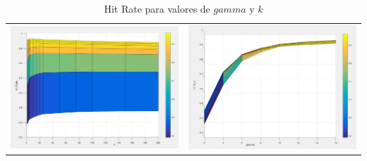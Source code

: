 \begin{table}[h!]
\begin{center}
\begin{tabular}{c c}
	\includegraphics[scale=0.3]{exp2/PLS-HitRate-2.png} &
	\includegraphics[scale=0.3]{exp2/PLS-HitRate-3.png}\\
\end{tabular}
\end{center}
\caption{Hit Rate para valores de $gamma$ y $k$}
\end{table}

